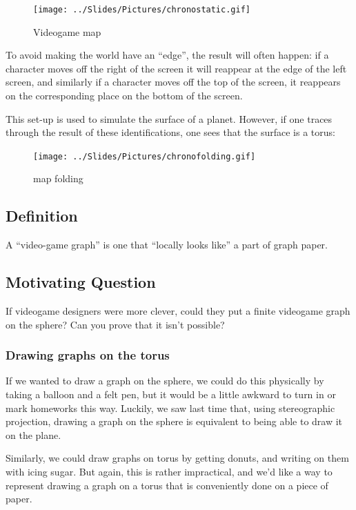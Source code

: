 \documentclass[]{article}
\begin{document}
\begin{figure}[htbp]
\centering
\texttt{[image: ../Slides/Pictures/chronostatic.gif]}
\caption{Videogame map}
\end{figure}

To avoid making the world have an ``edge'', the result will often
happen: if a character moves off the right of the screen it will
reappear at the edge of the left screen, and similarly if a character
moves off the top of the screen, it reappears on the corresponding place
on the bottom of the screen.

This set-up is used to simulate the surface of a planet. However, if one
traces through the result of these identifications, one sees that the
surface is a torus:

\begin{figure}[htbp]
\centering
\texttt{[image: ../Slides/Pictures/chronofolding.gif]}
\caption{map folding}
\end{figure}

\subsection{Definition}\label{definition-14}

A ``video-game graph'' is one that ``locally looks like'' a part of
graph paper.

\subsection{Motivating Question}\label{motivating-question}

If videogame designers were more clever, could they put a finite
videogame graph on the sphere? Can you prove that it isn't possible?

\subsubsection{Drawing graphs on the
torus}\label{drawing-graphs-on-the-torus}

If we wanted to draw a graph on the sphere, we could do this physically
by taking a balloon and a felt pen, but it would be a little awkward to
turn in or mark homeworks this way. Luckily, we saw last time that,
using stereographic projection, drawing a graph on the sphere is
equivalent to being able to draw it on the plane.

Similarly, we could draw graphs on torus by getting donuts, and writing
on them with icing sugar. But again, this is rather impractical, and
we'd like a way to represent drawing a graph on a torus that is
conveniently done on a piece of paper.
\end{document}
